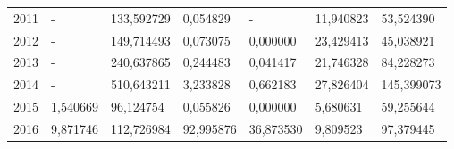 \begin{table}
\begin{tabular}{p{1cm}p{2cm}p{2cm}p{2cm}p{2cm}p{2cm}p{2cm}}
 2011 &                         - & 133,592729 &     0,054829 &                 - &                                          11,940823 &                       53,524390 \\
 2012 &                         - & 149,714493 &     0,073075 &          0,000000 &                                          23,429413 &                       45,038921 \\
 2013 &                         - & 240,637865 &     0,244483 &          0,041417 &                                          21,746328 &                       84,228273 \\
 2014 &                         - & 510,643211 &     3,233828 &          0,662183 &                                          27,826404 &                      145,399073 \\
 2015 &                  1,540669 &  96,124754 &     0,055826 &          0,000000 &                                           5,680631 &                       59,255644 \\
 2016 &                  9,871746 & 112,726984 &    92,995876 &         36,873530 &                                           9,809523 &                       97,379445 \\
\bottomrule
\end{tabular}
\end{table}
